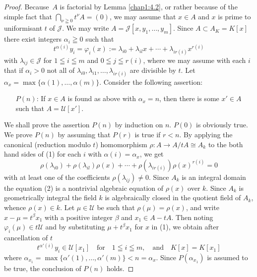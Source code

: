 \begin{proof}
Because\pageoriginale\ $A$ is factorial by Lemma \ref{chap1:4.2}, or
rather because of the simple fact that $\bigcap\limits_{\nu\geqq
  0}t^{\nu}A=(0)$, we may assume that $x\in A$ and $x$ is prime to
uniformisant $t$ of $\mathscr{J}$. We may write
$A=\mathscr{J}[x,y_{1},\ldots,y_{m}]$. Since $A\subset A_{K}=K[x]$
there exist integers $\alpha_{i}\geqq 0$ such that
\begin{equation*}
t^{\alpha(i)}y_{i}=\varphi_{i}(x):=\lambda_{i0}+\lambda_{il}x+\cdots+\lambda_{ir(i)}x^{r(i)}\tag{1} 
\end{equation*}
with $\lambda_{ij}\in\mathscr{J}$ for $1\leqq i\leqq m$ and $0\leqq
j\leqq r(i)$, where we may assume with each $i$ that if $\alpha_{i}>0$
not all of $\lambda_{i0},\lambda_{i1},\ldots,\lambda_{ir(i)}$ are
divisible by $t$. Let
$\alpha_{x}=\max\{\alpha(1),\ldots,\alpha(m)\}$. Consider the
following assertion:
\begin{itemize}
\item[$P(n)$:] If $x\in A$ is found as above with $\alpha_{x}=n$, then
  there is some $x'\in A$ such that $A=\mathscr{U}[x']$.
\end{itemize}
We shall prove the assertion $P(n)$ by induction on $n$. $P(0)$ is
obviously true. We prove $P(n)$ by assuming that $P(r)$ is true if
$r<n$. By applying the canonical (reduction modulo $t$) homomorphism
$\rho:A\to A/tA\cong A_{k}$ to the both hand sides of (1)  for
each $i$ with $\alpha(i)=\alpha_{x}$, we get
\begin{equation*}
\rho(\lambda_{i0})+\rho(\lambda_{il})\rho(x)+\cdots+\rho(\lambda_{ir(i)})\rho(x)^{r(i)}=0\tag{2}
\end{equation*}
with at least one of the coefficients $\rho(\lambda_{ij})\neq
0$. Since $A_{k}$ is an integral domain the equation (2) is a
nontrivial algebraic equation of $\rho(x)$ over $k$. Since $A_{k}$ is
geometrically integral the field $k$ is algebraically closed in the
quotient field of $A_{k}$, whence $\rho(x)\in k$. Let
$\mu\in\mathscr{U}$ be such that $\rho(\mu)=\rho(x)$, and
write\pageoriginale\ $x-\mu=t^{\beta}x_{1}$ with a positive integer
$\beta$ and $x_{1}\in A-tA$. Then noting $\varphi_{i}(\mu)\in
t\mathscr{U}$ and by substituting $\mu+t^{\beta}x_{1}$ for $x$ in (1),
we obtain after cancellation of $t$
$$
t^{\alpha'(i)}y_{i}\in\mathscr{U}[x_{1}]\quad\text{for}\quad 1\leqq
i\leqq m,\quad\text{and}\quad K[x]=K[x_{1}]
$$
where
$\alpha_{x_{1}}=\max\{\alpha'(1),\ldots,\alpha'(m)\}<n=\alpha_{x}$. Since
$P(\alpha_{x_{1}})$ is assumed to be true, the conclusion of $P(n)$
holds.
\end{proof}

